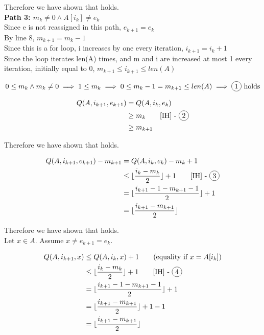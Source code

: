 \documentclass{article}
\newcommand{\floor}[1]{\lfloor #1 \rfloor}
\DeclareRobustCommand*\circled[1]{\tikz[baseline =(char.base)]{\node[shape=circle, draw, inner sep = 2pt] (char) {#1};}}
\begin{document}
\begin{enumerate}
	Therefore we have shown that \circled{4} holds. \\
	
	\textbf{Path 3: $m_k \neq 0 \land A[i_k] \neq e_k$}\\
	Since e is not reassigned in this path, $e_{k+1} =e_k$\\
	By line 8, $m_{k+1} = m_k - 1$ \\
	Since this is a for loop, i increases by one every iteration, $i_{k+1} = i_k +1$ \\
	Since the loop iterates len(A) times, and m and i are increased at most 1 every iteration, initially equal to 0, $m_{k+1} \leq i_{k+1} \leq len(A) $
	
	$$0 \leq m_k \land m_k \neq 0 \implies 1 \leq m_k \implies 0 \leq m_k - 1 = m_{k+1} \leq len(A) \implies  \circled{1} \text{ holds}$$

	\begin{align*}
	Q(A, i_{k+1}, e_{k+1}) &= Q(A, i_k, e_k) \\
	&\geq m_k \tag*{[IH] - \circled{2}} \\
	&\geq m_{k+1} \\
	\end{align*}

	Therefore we have shown that \circled{2} holds.
	
	\begin{align*}
		Q(A, i_{k+1}, e_{k+1}) - m_{k+1} &= Q(A, i_k, e_k) - m_k + 1 \\
		 &\leq  \floor{\frac{i_k - m_k}{2}} + 1 \tag*{[IH] - \circled{3}}\\
		 &= \floor{\frac{i_{k+1} - 1 - m_{k+1} -1}{2}} + 1 \\
		 &= \floor{\frac{i_{k+1} - m_{k+1}}{2}}
	\end{align*}
	
	Therefore we have shown that \circled{3} holds. \\
	
	Let $x \in A$. Assume $x \neq e_{k+1} = e_k$.
	
	\begin{align*}
	Q(A, i_{k+1}, x) &\leq Q(A, i_k, x) + 1 \tag{equality if $x = A[i_k]$}\\
	&\leq \floor{\frac{i_k - m_k}{2}} + 1 \tag*{[IH] - \circled{4}} \\
	&= \floor{\frac{i_{k+1} - 1 - m_{k+1} - 1}{2}} + 1\\
	&= \floor{\frac{i_{k+1} - m_{k+1}}{2}} + 1 - 1 \\
	&= \floor{\frac{i_{k+1} - m_{k+1}}{2}}
	\end{align*}
	

\end{enumerate}
\end{document}
